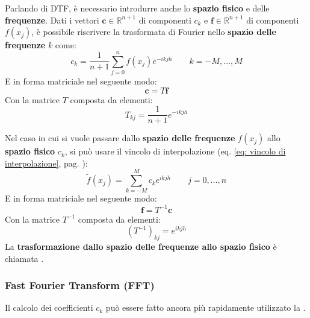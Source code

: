 \highspace
Parlando di DTF, è necessario introdurre anche lo \textbf{spazio fisico} e delle \textbf{frequenze}. Dati i vettori $\mathbf{c} \in \mathbb{R}^{n+1}$ di componenti $c_{k}$ e $\mathbf{f} \in \mathbb{R}^{n+1}$ di componenti $f\left(x_{j}\right)$, è possibile riscrivere la trasformata di Fourier nello \textbf{spazio delle frequenze} $k$ come:
\begin{equation*}
	c_{k} = \dfrac{1}{n+1} \displaystyle\sum_{j=0}^{n} f\left(x_{j}\right) e^{-ikjh} \hspace{2em} k = -M, \dots, M
\end{equation*}
E in forma matriciale nel seguente modo:
\begin{equation}
	\mathbf{c} = T\mathbf{f}
\end{equation}
Con la matrice $T$ composta da elementi:
\begin{equation*}
	T_{kj} = \dfrac{1}{n+1} e^{-ikjh}
\end{equation*}

\highspace
Nel caso in cui si vuole passare dallo \textbf{spazio delle frequenze} $f\left(x_{j}\right)$ allo \textbf{spazio fisico} $c_{k}$, si può usare il vincolo di interpolazione (eq. \ref{eq: vincolo di interpolazione}, pag. \pageref{eq: vincolo di interpolazione}):
\begin{equation*}
	\tilde{f}\left(x_{j}\right) = \displaystyle\sum_{k = -M}^{M} c_{k}e^{ikjh} \hspace{2em} j = 0, \dots, n
\end{equation*}
E in forma matriciale nel seguente modo:
\begin{equation}
	\mathbf{f} = T^{-1} \mathbf{c}
\end{equation}
Con la matrice $T^{-1}$ composta da elementi:
\begin{equation*}
	\left(T^{-1}\right)_{kj} = e^{ikjh}
\end{equation*}
La \textbf{trasformazione dallo spazio delle frequenze allo spazio fisico} è chiamata .

\newpage

\subsubsection{Fast Fourier Transform (FFT)}

Il calcolo dei coefficienti $c_{k}$ può essere fatto ancora più rapidamente utilizzato la .

